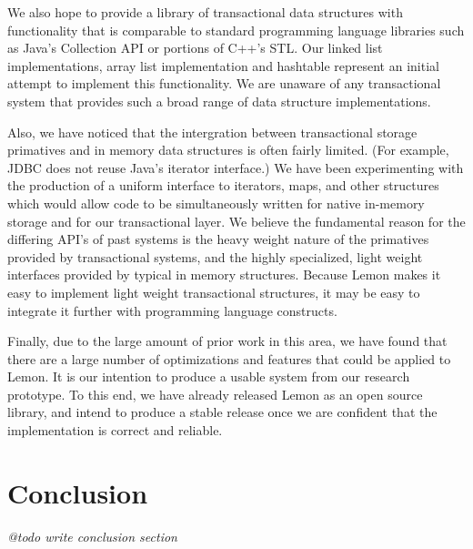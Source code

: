 \documentclass[letterpaper,twocolumn,english]{article}
\newcommand{\yad}{Lemon\xspace}
\begin{document}
We also hope to provide a library of
transactional data structures with functionality that is comparable to
standard programming language libraries such as Java's Collection API
or portions of C++'s STL.  Our linked list implementations, array list
implementation and hashtable represent an initial attempt to implement
this functionality.  We are unaware of any transactional system that
provides such a broad range of data structure implementations.  

Also, we have noticed that the intergration between transactional
storage primatives and in memory data structures is often fairly
limited.  (For example, JDBC does not reuse Java's iterator
interface.)  We have been experimenting with the production of a
uniform interface to iterators, maps, and other structures which would
allow code to be simultaneously written for native in-memory storage
and for our transactional layer.  We believe the fundamental reason
for the differing API's of past systems is the heavy weight nature of
the primatives provided by transactional systems, and the highly
specialized, light weight interfaces provided by typical in memory
structures.  Because \yad makes it easy to implement light weight
transactional structures, it may be easy to integrate it further with
programming language constructs.

Finally, due to the large amount of prior work in this area, we have
found that there are a large number of optimizations and features that
could be applied to \yad.  It is our intention to produce a usable
system from our research prototype.  To this end, we have already
released \yad as an open source library, and intend to produce a
stable release once we are confident that the implementation is correct
and reliable.  


\section{Conclusion}

{\em @todo write conclusion section}
\end{document}
